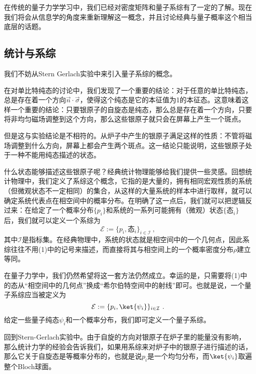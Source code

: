 


在传统的量子力学学习中，我们已经对密度矩阵和量子系综有了一定的了解。现在我们将会从信息学的角度来重新理解这一概念，并且讨论经典与量子概率这个相当底层的话题。

\subsection{统计与系综}

我们不妨从Stern Gerlach实验中来引入量子系综的概念。

在对单比特纯态的讨论中，我们发现了一个重要的结论：对于任意的单比特纯态，总是存在着一个方向$\vec{n}\cdot\vec{\sigma}$，使得这个纯态是它的本征值为1的本征态。这意味着这样一个重要的结论：只要银原子的自旋态是纯态，那么总是存在着一个方向，只要将非均匀磁场调整到这个方向，那么这些银原子就只会在屏幕上产生一个斑点。

但是这与实验结论是不相符的。从炉子中产生的银原子满足这样的性质：不管将磁场调整到什么方向，屏幕上都会产生两个斑点。这一结论只能说明，这些银原子处于一种不能用纯态描述的状态。

什么状态能够描述这些银原子呢？经典统计物理能够给我们提供一些灵感。回想统计物理中，我们定义了系综这个概念，它指的是大量的，拥有相同宏观性质的系统（但微观状态不一定相同）的集合，从这样的大量系统的样本中进行取样，就可以确定系统代表点在相空间中的概率分布。在明确了这一点后，我们就可以把逻辑反过来：在给定了一个概率分布$\{p_i\}$和系统的一系列可能拥有（微观）状态$\{\text{态}_i\}$后，我们就可以定义一个系综为
\begin{equation}
\mathcal{E}:=\{p_i, \text{态}_i\}_{i\in\mathcal{I}}~,
\end{equation}
其中$\mathcal{I}$是指标集。在经典物理中，系统的状态就是相空间中的一个几何点，因此系综往往不用(1)中的记号来描述，而直接将其与相空间上的一个概率密度分布$\rho$建立等同。

在量子力学中，我们仍然希望将这一套方法仍然成立。幸运的是，只需要将(1)中的态从“相空间中的几何点”换成“希尔伯特空间中的射线”即可。也就是说，一个量子系综应当被定义为
\begin{equation}
\mathcal{E}:=\{p_i,\ket{\psi_i}\}_{i\in\mathcal{I}}~.
\end{equation}
给定一些量子纯态$\psi_i$和一个概率分布，我们即可定义一个量子系综。

回到Stern-Gerlach实验中。由于自旋的方向对银原子在炉子里的能量没有影响，那么统计力学的经验会告诉我们，如果用系综来对炉子中的银原子进行描述的话，那么它关于自旋态是等概率分布的，也就是说$p_i$是一个均匀分布，而$\ket{\psi_i}$取遍整个Bloch球面。

